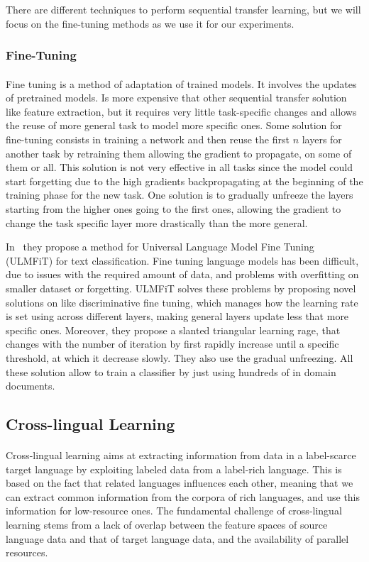 There are different techniques to perform sequential transfer learning, but we will focus on the fine-tuning methods as we use it for our experiments. 

\subsubsection{Fine-Tuning}
\paragraph{}
Fine tuning is a method of adaptation of trained models. It involves the updates of pretrained models. Is more expensive that other sequential transfer solution like feature extraction, but it requires very little task-specific changes and allows the reuse of more general task to model more specific ones.
Some solution for fine-tuning consists in training a network and then reuse the first $n$ layers for another task by retraining them allowing the gradient to propagate, on some of them or all. This solution is not very effective in all tasks since the model could start forgetting due to the high gradients backpropagating at the beginning of the training phase for the new task. One solution is to gradually unfreeze the layers starting from the higher ones going to the first ones, allowing the gradient to change the task specific layer more drastically than the more general. 

In~\citep{howard-ruder-2018-universal} they propose a method for Universal Language Model Fine Tuning (ULMFiT) for text classification. Fine tuning language models has been difficult, due to issues with the required amount of data, and problems with overfitting on smaller dataset or forgetting. ULMFiT solves these problems by proposing novel solutions on like discriminative fine tuning, which manages how the learning rate is set using across different layers, making general layers update less that more specific ones. Moreover, they propose a slanted triangular learning rage, that changes with the number of iteration by first rapidly increase until a specific threshold, at which it decrease slowly. They also use the gradual unfreezing. All these solution allow to train a classifier by just using hundreds of in domain documents.

\subsection{Cross-lingual Learning}
\paragraph{}
Cross-lingual learning aims at extracting information from data in a label-scarce target language by exploiting labeled data from a label-rich language. This is based on the fact that related languages influences each other, meaning that we can extract common information from the corpora of rich languages, and use this information for low-resource ones.  The fundamental challenge of cross-lingual learning stems from a lack of overlap between the feature spaces of source language data and that of target language data, and the availability of parallel resources. 

